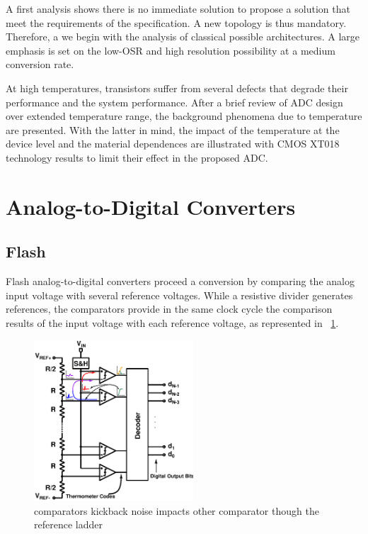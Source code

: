 A first analysis shows there is no immediate solution to propose a solution that meet the requirements of the specification. A new topology is thus mandatory. Therefore, a we begin with the analysis of classical possible architectures. A large emphasis is set on the low-OSR and high resolution possibility at a medium conversion rate.

At high temperatures, transistors suffer from several defects that degrade their performance and the system performance. After a brief review of ADC design over extended temperature range, the background phenomena due to temperature are presented. With the latter in mind, the impact of the temperature at the device level and the material dependences are illustrated with CMOS XT018 technology results to limit their effect in the proposed ADC\@. %
\section{Analog-to-Digital Converters}
\subsection{Flash}                             %
\label{sec:flash-adc}
Flash analog-to-digital converters proceed a conversion by comparing the analog input voltage with several reference voltages. While a resistive divider generates references, the comparators provide in the same clock cycle the comparison results of the input voltage with each reference voltage, as represented in \figurename~\ref{fig:flash_kickback}. 

\begin{figure}[htp]
	\centering
	\includegraphics[height=6cm]{Chapter3/Figs/flash_adc.ps}
	\caption{comparators kickback noise impacts other comparator though the reference ladder}
	\label{fig:flash_kickback}
\end{figure}

